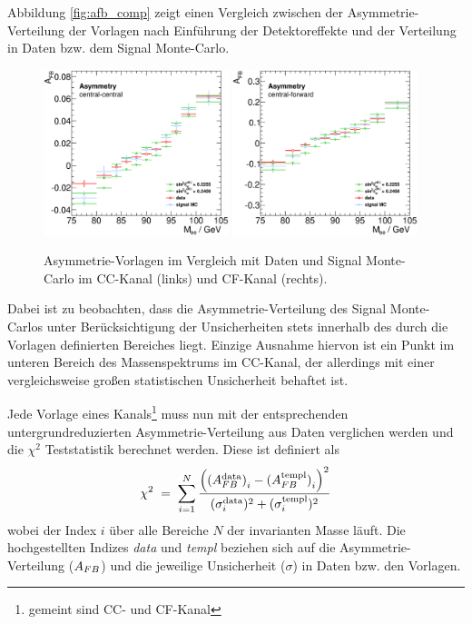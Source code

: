 Abbildung \ref{fig:afb_comp} zeigt einen Vergleich zwischen der
Asymmetrie-Verteilung der Vorlagen nach Einführung der Detektoreffekte und
der Verteilung in Daten bzw. dem Signal Monte-Carlo.
\begin{figure}
    \centering
    \includegraphics[width=0.48\textwidth]{plots/afb_comp_cc}
    \hfill
    \includegraphics[width=0.48\textwidth]{plots/afb_comp_cf}
    \caption[Asymmetrie-Vorlagen im Vergleich mit Daten und Signal Monte-Carlo]
        {Asymmetrie-Vorlagen im Vergleich mit Daten und Signal Monte-Carlo im
        \ac{CC}-Kanal (links) und  \ac{CF}-Kanal (rechts).}
    \label{fig:afb:afb_comp}
\end{figure}
Dabei ist zu beobachten, dass die Asymmetrie-Verteilung des Signal Monte-Carlos
unter Berücksichtigung der Unsicherheiten stets innerhalb des durch die
Vorlagen definierten Bereiches liegt. Einzige Ausnahme hiervon ist ein Punkt im
unteren Bereich des Massenspektrums im CC-Kanal, der allerdings mit einer
vergleichsweise großen statistischen Unsicherheit behaftet ist.

Jede Vorlage eines Kanals\footnote{gemeint sind \ac{CC}- und \ac{CF}-Kanal}
muss nun mit der entsprechenden untergrundreduzierten Asymmetrie-Verteilung aus
Daten verglichen werden und die $\chi^2$ Teststatistik berechnet werden. Diese
ist definiert als
\begin{equation}
    \chi^2 \;=\; \sum_{i=1}^{N}
        \frac{
            \left(
                {(A_{FB}^\text{data})}_i - {(A_{FB}^\text{templ})}_i
            \right)^2
        }{
            (\sigma_i^\text{data})^2 + (\sigma_i^\text{templ})^2
        }
\end{equation}
wobei der Index $i$ über alle Bereiche $N$ der invarianten Masse läuft. Die
hochgestellten Indizes \textit{data} und \textit{templ} beziehen sich auf die
Asymmetrie-Verteilung ($A_{FB}$) und die jeweilige Unsicherheit ($\sigma$) in
Daten bzw. den Vorlagen.



